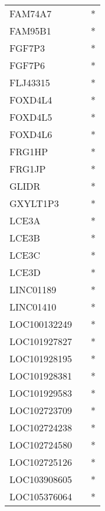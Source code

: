 \begin{longtable}{lcc}
FAM74A7            &                &          * \\
FAM95B1            &                &          * \\
FGF7P3             &                &          * \\
FGF7P6             &                &          * \\
FLJ43315           &                &          * \\
FOXD4L4            &                &          * \\
FOXD4L5            &                &          * \\
FOXD4L6            &                &          * \\
FRG1HP             &                &          * \\
FRG1JP             &                &          * \\
GLIDR              &                &          * \\
GXYLT1P3           &                &          * \\
LCE3A              &                &          * \\
LCE3B              &                &          * \\
LCE3C              &                &          * \\
LCE3D              &                &          * \\
LINC01189          &                &          * \\
LINC01410          &                &          * \\
LOC100132249       &                &          * \\
LOC101927827       &                &          * \\
LOC101928195       &                &          * \\
LOC101928381       &                &          * \\
LOC101929583       &                &          * \\
LOC102723709       &                &          * \\
LOC102724238       &                &          * \\
LOC102724580       &                &          * \\
LOC102725126       &                &          * \\
LOC103908605       &                &          * \\
LOC105376064       &                &          * \\

\end{longtable}
